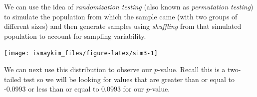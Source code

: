 \documentclass[]{tufte-book}
\newenvironment{Shaded}{\begin{snugshade}}{\end{snugshade}}
\newcommand{\KeywordTok}[1]{\textcolor[rgb]{0.13,0.29,0.53}{\textbf{{#1}}}}
\newcommand{\DataTypeTok}[1]{\textcolor[rgb]{0.13,0.29,0.53}{{#1}}}
\newcommand{\DecValTok}[1]{\textcolor[rgb]{0.00,0.00,0.81}{{#1}}}
\newcommand{\StringTok}[1]{\textcolor[rgb]{0.31,0.60,0.02}{{#1}}}
\newcommand{\NormalTok}[1]{{#1}}
\begin{document}
We can use the idea of \emph{randomization testing} (also known as
\emph{permutation testing}) to simulate the population from which the
sample came (with two groups of different sizes) and then generate
samples using \emph{shuffling} from that simulated population to account
for sampling variability.

\begin{Shaded}
\end{Shaded}

\begin{center}\texttt{[image: ismaykim\_files/figure-latex/sim3-1]} \end{center}

We can next use this distribution to observe our \(p\)-value. Recall
this is a two-tailed test so we will be looking for values that are
greater than or equal to -0.0993 or less than or equal to 0.0993 for our
\(p\)-value.

\begin{Shaded}
\end{Shaded}
\end{document}
